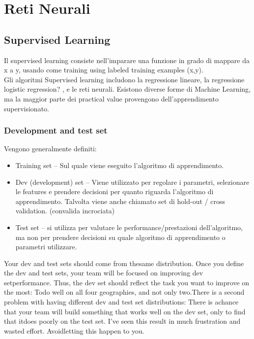 \chapter{Reti Neurali}
\label{chap:RetiNeurali}

\section{Supervised Learning}
\label{sec:SupervisedLearning}

Il supervised  learning​ consiste nell'imparare una funzione in grado di mappare da x a y, usando come training using  labeled  training  examples  (x,y).  \\
Gli algoritmi Supervised  learning  includono la regressione lineare, la regressione logistic  regression? , e le reti neurali. Esistono diverse forme di Machine Learning, ma la maggior parte dei practical  value  provengono dell'apprendimento supervisionato.

\subsection{Development and test set }
\label{subsec:DevelopmentAndTestSet}

Vengono generalmente definiti: 
\begin{itemize}
	\item Training set – Sul quale viene eseguito l'algoritmo di apprendimento.
	\item Dev (development) set – Viene utilizzato per regolare i parametri, selezionare le features e prendere decisioni per quanto riguarda l'algoritmo di apprendimento. Talvolta viene anche chiamato set di hold-out / cross  validation. (convalida incrociata)
	\item Test set – si utilizza per valutare le performance/prestazioni dell'algoritmo, ma non per prendere decisioni su quale algoritmo di apprendimento o parametri utilizzare. 
\end{itemize}

Your  dev  and  test  sets  should  come  from  thesame  distribution.
Once  you  define  the  dev  and  test  sets,  your  team  will  be  focused  on  improving  dev  setperformance.  Thus,  the  dev  set  should  reflect  the  task  you  want  to  improve  on  the  most:  Todo  well  on  all  four  geographies,  and  not  only  two.There  is  a  second  problem  with  having  different  dev  and  test  set  distributions:  There  is  achance  that  your  team  will  build  something  that  works  well  on  the  dev  set,  only  to  find  that  itdoes  poorly  on  the  test  set.  I’ve  seen  this  result  in  much  frustration  and  wasted  effort.  Avoidletting  this  happen  to  you.

